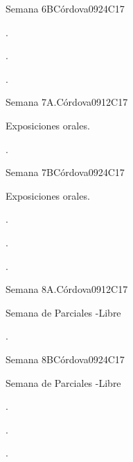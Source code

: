 \begin{syllabus}
\begin{unit}{Semana 6B}{}{Córdova09}{24}{C17}
   \begin{learningoutcomes}
      \item . 
      \item .
      \item . 
      \end{learningoutcomes}
\end{unit}

\begin{unit}{Semana 7A.}{}{Córdova09}{12}{C17}
   \begin{topics}
      \item Exposiciones orales.
   \end{topics}
   \begin{learningoutcomes}
      \item . 
   \end{learningoutcomes}
\end{unit}

\begin{unit}{Semana 7B}{}{Córdova09}{24}{C17}
   \begin{topics}
      \item Exposiciones orales.
   \end{topics}

   \begin{learningoutcomes}
      \item . 
      \item .
      \item . 
      \end{learningoutcomes}
\end{unit}

\begin{unit}{Semana 8A.}{}{Córdova09}{12}{C17}
   \begin{topics}
      \item Semana de Parciales -Libre
   \end{topics}
   \begin{learningoutcomes}
      \item . 
   \end{learningoutcomes}
\end{unit}

\begin{unit}{Semana 8B}{}{Córdova09}{24}{C17}
   \begin{topics}
      \item Semana de Parciales -Libre
   \end{topics}

   \begin{learningoutcomes}
      \item . 
      \item .
      \item . 
      \end{learningoutcomes}
\end{unit}


\end{syllabus}
